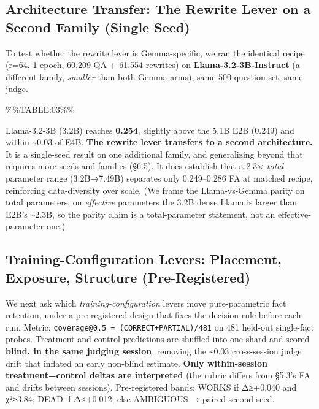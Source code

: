 \hypertarget{architecture-transfer-the-rewrite-lever-on-a-second-family-single-seed}{%
\subsection{Architecture Transfer: The Rewrite Lever on a Second Family (Single Seed)}\label{architecture-transfer-the-rewrite-lever-on-a-second-family-single-seed}}

To test whether the rewrite lever is Gemma-specific, we ran the identical recipe (r=64, 1 epoch, 60,209 QA + 61,554 rewrites) on \textbf{Llama-3.2-3B-Instruct} (a different family, \emph{smaller} than both Gemma arms), same 500-question set, same judge.

\%\%TABLE:03\%\%

Llama-3.2-3B (3.2B) reaches \textbf{0.254}, slightly above the 5.1B E2B (0.249) and within \textasciitilde0.03 of E4B. \textbf{The rewrite lever transfers to a second architecture.} It is a single-seed result on one additional family, and generalizing beyond that requires more seeds and families (§6.5). It does establish that a 2.3× \emph{total}-parameter range (3.2B→7.49B) separates only 0.249--0.286 FA at matched recipe, reinforcing data-diversity over scale. (We frame the Llama-vs-Gemma parity on total parameters; on \emph{effective} parameters the 3.2B dense Llama is larger than E2B's \textasciitilde2.3B, so the parity claim is a total-parameter statement, not an effective-parameter one.)

\hypertarget{training-configuration-levers-placement-exposure-structure-pre-registered}{%
\subsection{Training-Configuration Levers: Placement, Exposure, Structure (Pre-Registered)}\label{training-configuration-levers-placement-exposure-structure-pre-registered}}

We next ask which \emph{training-configuration} levers move pure-parametric fact retention, under a pre-registered design that fixes the decision rule before each run. Metric: \texttt{coverage@0.5\ =\ (CORRECT+PARTIAL)/481} on 481 held-out single-fact probes. Treatment and control predictions are shuffled into one shard and scored \textbf{blind, in the same judging session}, removing the \textasciitilde0.03 cross-session judge drift that inflated an early non-blind estimate. \textbf{Only within-session treatment−control deltas are interpreted} (the rubric differs from §5.3's FA and drifts between sessions). Pre-registered bands: WORKS if Δ≥+0.040 and χ²≥3.84; DEAD if Δ≤+0.012; else AMBIGUOUS → paired second seed.

